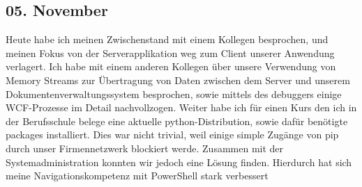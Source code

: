 \subsection{05. November}
Heute habe ich meinen Zwischenstand mit einem Kollegen besprochen, und meinen Fokus von der Serverapplikation weg zum Client unserer Anwendung verlagert. Ich habe mit einem anderen Kollegen über unsere Verwendung von Memory Streams zur Übertragung von Daten zwischen dem Server und unserem Dokumentenverwaltungssystem besprochen, sowie mittels des debuggers einige WCF-Prozesse im Detail nachvollzogen. Weiter habe ich für einen Kurs den ich in der Berufsschule belege eine aktuelle python-Distribution, sowie dafür benötigte packages installiert. Dies war nicht trivial, weil einige simple Zugänge von pip durch unser Firmennetzwerk blockiert werde. Zusammen mit der Systemadministration konnten wir jedoch eine Lösung finden. Hierdurch hat sich meine Navigationskompetenz mit PowerShell stark verbessert
